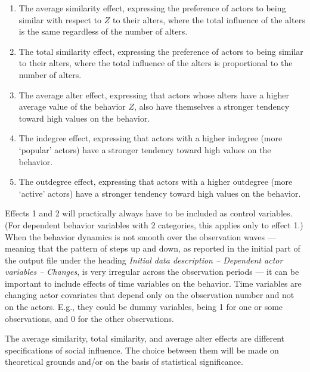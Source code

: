 \documentclass[a4paper,fleqn]{article}
\newcommand{\+}{\, + \,}
\begin{document}
{\begin{enumerate}
\item The average similarity effect, expressing the preference of actors
      to being similar with respect to $Z$ to their alters,
      where the total influence of the alters is the same
      regardless of the number of alters.
\item The total similarity effect, expressing the preference of actors
      to being similar to their alters,
      where the total influence of the alters is proportional to
      the number of alters.
\item The average alter effect, expressing that actors
      whose alters have a higher average value of the behavior $Z$,
      also have themselves a stronger tendency toward high values on the behavior.
\item The indegree effect, expressing that actors with a higher indegree
      (more `popular' actors) have a stronger tendency toward high values on the behavior.
\item The outdegree effect, expressing that actors with a higher outdegree
      (more `active' actors) have a stronger tendency toward high values on the behavior.
\end{enumerate}
Effects 1 and 2 will practically always have to be included as control variables.
(For dependent behavior variables with 2 categories, this applies only to effect 1.)
When the behavior dynamics is not smooth over the observation waves --- meaning that
the pattern of steps up and down, as reported in the initial part of the output
file under the heading \emph{Initial data description -- Dependent actor variables -- Changes},
is very irregular across the observation periods --- it can be important to include
effects of time variables on the behavior.
Time variables are changing actor covariates that depend only on the
observation number and not on the actors. E.g., they could be dummy variables, being 1
for one or some observations, and 0 for the other observations.

The average similarity, total similarity, and average alter effects
are different specifications of social influence.
The choice between them will be made on theoretical grounds
and/or on the basis of statistical significance.
\medskip

}
\end{document}
